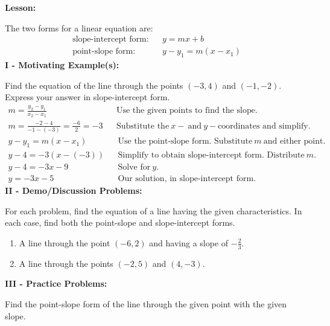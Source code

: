 \documentclass[12pt]{article}
\theoremstyle{definition}
\begin{document}
{\bf Lesson:}
\par
The two forms for a linear equation are:
\begin{eqnarray*}
\text{slope-intercept form:} & & y=mx+b\\
\text{point-slope form:} & & y-y_1=m(x-x_1)
\end{eqnarray*}
{\bf I - Motivating Example(s):}\\
\par
Find the equation of the line through the points $(- 3, 4)$ and $(- 1,
  - 2)$.  Express your answer in slope-intercept form.
  \begin{eqnarray*}
    m = \frac{y_2 - y_1}{x_2 - x_1} &  & \text{Use the given points to find the slope.}\\
    m = \frac{- 2 - 4}{- 1 - (- 3)} = \frac{- 6}{2} = - 3 &  & \text{Substitute the} \ x- \ \text{and} \ y-\text{coordinates and simplify.}
	\end{eqnarray*}
	\begin{eqnarray*}
    y - y_1 = m (x - x_1) &  & \text{Use the point-slope form.  Substitute} \ m \ \text{and either point.}\\
    y - 4 = - 3 (x - (- 3)) &  & \text{Simplify to obtain slope-intercept form.  Distribute} \ m.\\
    y - 4 = - 3 x - 9 &  & \text{Solve for} \ y. \\
    y = - 3 x - 5 &  & \text{Our solution, in slope-intercept form.}
  \end{eqnarray*}
\newpage
{\bf II - Demo/Discussion Problems:}\\
\par
For each problem, find the equation of a line having the given characteristics.  In each case, find both the point-slope and slope-intercept forms.
\begin{enumerate}
	\item A line through the point $(-6,2)$ and having a slope of $-\frac{2}{3}$.
	\item A line through the points $(-2,5)$ and $(4,-3)$.
\end{enumerate}

{\bf III - Practice Problems:}\\
\par
Find the point-slope form of the line through the given point with the given slope.
\end{document}
